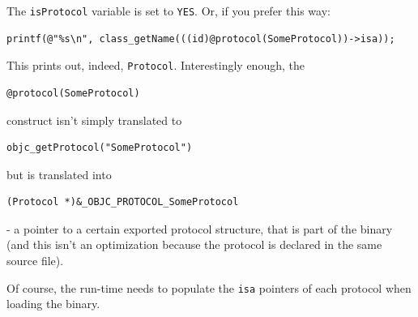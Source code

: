 The \verb=isProtocol= variable is set to \verb=YES=. Or, if you prefer this way:

\begin{verbatim}
printf(@"%s\n", class_getName(((id)@protocol(SomeProtocol))->isa));
\end{verbatim}

This prints out, indeed, \verb=Protocol=. Interestingly enough, the

\begin{verbatim}@protocol(SomeProtocol)\end{verbatim}
  
construct isn't simply translated to

\begin{verbatim}objc_getProtocol("SomeProtocol")\end{verbatim}

but is translated into 

\begin{verbatim}(Protocol *)&_OBJC_PROTOCOL_SomeProtocol\end{verbatim}

- a pointer to a certain exported protocol structure, that is part of the binary (and this isn't an optimization because the protocol is declared in the same source file).

Of course, the run-time needs to populate the \verb=isa= pointers of each protocol when loading the binary.
